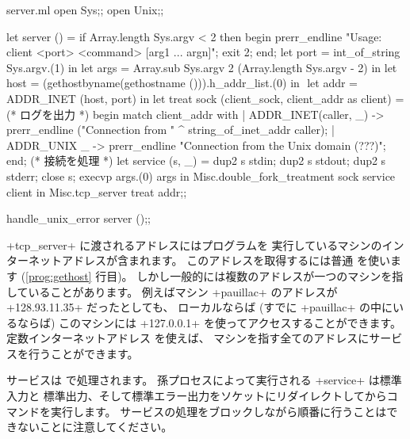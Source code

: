 %
\begin{listingcodefile}[style=numbers]{server.ml}
open Sys;;
open Unix;;

let server () =
  if Array.length Sys.argv < 2 then begin
    prerr_endline "Usage: client <port> <command> [arg1 ... argn]";
    exit 2;
  end;
  let port = int_of_string Sys.argv.(1) in
  let args = Array.sub Sys.argv 2 (Array.length Sys.argv - 2) in
  let host = (gethostbyname(gethostname ())).h_addr_list.(0) in $\label{prog:gethost}$
  let addr = ADDR_INET (host, port) in
  let treat sock (client_sock, client_addr as client) =
    (* ログを出力 *)
    begin match client_addr with
    | ADDR_INET(caller, _) ->
        prerr_endline ("Connection from " ^ string_of_inet_addr caller);
    | ADDR_UNIX _ ->
        prerr_endline "Connection from the Unix domain (???)";
    end;
    (* 接続を処理 *)
    let service (s, _) =
      dup2 s stdin; dup2 s stdout; dup2 s stderr; close s;
      execvp args.(0) args
    in
    Misc.double_fork_treatment sock service client in
  Misc.tcp_server treat addr;;

handle_unix_error server ();;
\end{listingcodefile}
%
\ml+tcp_server+ に渡されるアドレスにはプログラムを
実行しているマシンのインターネットアドレスが含まれます。
このアドレスを取得するには普通  を使います
(\ref{prog:gethost} 行目)。
しかし一般的には複数のアドレスが一つのマシンを指していることがあります。
例えばマシン \ml+pauillac+ のアドレスが \ml+128.93.11.35+ だったとしても、
ローカルならば (すでに \ml+pauillac+ の中にいるならば)
このマシンには \ml+127.0.0.1+ を使ってアクセスすることができます。
定数インターネットアドレス  を使えば、
マシンを指す全てのアドレスにサービスを行うことができます。

サービスは  で処理されます。
孫プロセスによって実行される \ml+service+ は標準入力と
標準出力、そして標準エラー出力をソケットにリダイレクトしてからコマンドを実行します。
サービスの処理をブロックしながら順番に行うことはできないことに注意してください。


